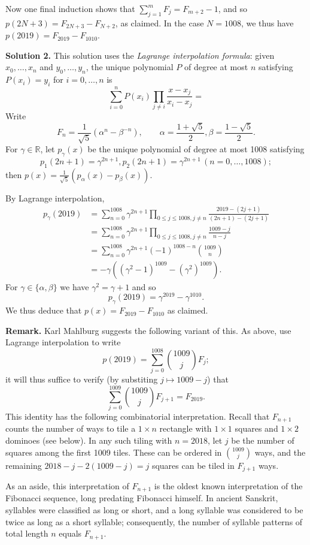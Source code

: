 \documentclass[amssymb,twocolumn,pra,10pt,aps]{revtex4-1}
\begin{document}
\begin{itemize}
Now one final induction shows that $\sum_{j=1}^m F_j = F_{m+2}-1$, and so $p(2N+3) = F_{2N+3}-F_{N+2}$, as claimed. In the case $N=1008$, we thus have $p(2019) = F_{2019} - F_{1010}$.

\noindent
\textbf{Solution 2.}
This solution uses the \emph{Lagrange interpolation formula}: given $x_0,\dots,x_n$ and $y_0,\dots,y_n$, the unique polynomial $P$ of degree at most $n$ satisfying $P(x_i) = y_i$ for $i=0,\dots,n$ is
\[
\sum_{i=0}^n P(x_i) \prod_{j \neq i} \frac{x-x_j}{x_i-x_j} =
\]
Write 
\[
F_n = \frac{1}{\sqrt{5}}(\alpha^n - \beta^{-n}), \qquad \alpha = \frac{1+\sqrt{5}}{2}, \beta = \frac{1-\sqrt{5}}{2}.
\]
For $\gamma \in \mathbb{R}$, let $p_\gamma(x)$ be the unique polynomial of degree at most 1008 satisfying
\[
p_1(2n+1) = \gamma^{2n+1}, p_2(2n+1) = \gamma^{2n+1} \, (n=0,\dots,1008);
\]
then $p(x) = \frac{1}{\sqrt{5}}(p_\alpha(x) - p_\beta(x))$.

By Lagrange interpolation,
\begin{align*}
p_\gamma(2019) &= \sum_{n=0}^{1008} \gamma^{2n+1} \prod_{0 \leq j \leq 1008, j \neq n} \frac{2019-(2j+1)}{(2n+1)-(2j+1)}\\
&= \sum_{n=0}^{1008} \gamma^{2n+1} \prod_{0 \leq j \leq 1008, j \neq n} \frac{1009-j}{n-j}\\
&= \sum_{n=0}^{1008} \gamma^{2n+1} (-1)^{1008-n} \binom{1009}{n} \\
&= -\gamma ((\gamma^2-1)^{1009} - (\gamma^2)^{1009}).
\end{align*}
For $\gamma \in \{\alpha, \beta\}$ we have $\gamma^2 = \gamma + 1$ and so
\[
p_\gamma(2019) = \gamma^{2019} - \gamma^{1010}.
\]
We thus deduce that $p(x) = F_{2019} - F_{1010}$ as claimed.

\noindent
\textbf{Remark.}
Karl Mahlburg suggests the following variant of this. As above, use Lagrange interpolation to write
\[
p(2019) = \sum_{j=0}^{1008} \binom{1009}{j} F_j;
\]
it will thus suffice to verify (by substiting $j \mapsto 1009-j$) that
\[
\sum_{j=0}^{1009} \binom{1009}{j} F_{j+1} = F_{2019}.
\]
This identity has the following combinatorial interpretation. Recall that $F_{n+1}$ counts the number of ways to tile a $1 \times n$ rectangle with $1 \times 1$ squares and $1 \times 2$ dominoes (see below). In any such tiling with $n = 2018$, let $j$ be the number of squares among the first 1009 tiles.
These can be ordered in $\binom{1009}{j}$ ways, and the remaining $2018 - j - 2(1009-j) = j$ squares can be
tiled in $F_{j+1}$ ways.

As an aside, this interpretation of $F_{n+1}$ is the oldest known interpretation of the Fibonacci sequence,
long predating Fibonacci himself. In ancient Sanskrit, syllables were classified as long or short, and a long syllable was considered to be twice as long as a short syllable; consequently, the number of syllable patterns of total length $n$ equals $F_{n+1}$.


\end{itemize}
\end{document}
